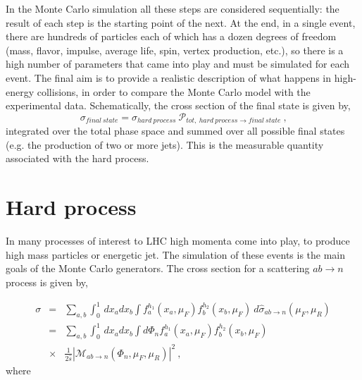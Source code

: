 In the  Monte Carlo simulation  all these steps are considered sequentially: the result of each step is the starting point of the next.
At the end, in a single event, there are hundreds of particles each of which has a dozen degrees of freedom (mass, flavor, impulse, average life, spin, vertex production, etc.), so there is a  high number of parameters that came into play and must be simulated for each event.
The final aim is to provide a realistic description of what happens in high-energy collisions, in order to compare the Monte Carlo model with the experimental data.
Schematically, the cross section of the final state is given by,
\begin{equation}
 \sigma_{final \: state}=\sigma_{hard \: process} \: \mathcal{P}_{tot, \:hard \: process \rightarrow final \:state} \: \mbox{,}\end{equation}
integrated over the total phase space and summed over all possible final states (e.g. the production of two or more jets). This is the measurable quantity associated with the hard process. \\




\section{Hard process}

In many processes of interest to LHC high momenta come into play, to produce high mass particles or  energetic jet. The simulation of these events is the main goals of the Monte Carlo generators.
The cross section for a scattering $ ab \rightarrow n $ process is given \cite{Buckley:2011ms} by,

\begin{eqnarray}
 \sigma & = & \sum_{a,b}  \int_{0}^{1} \, dx_{a} dx_b \int f_{a}^{h_1} (x_a , \mu_F) f_{b}^{h_2} (x_b , \mu_F) \: d \hat{\sigma}_{ab \rightarrow n}(\mu_F , \mu_R)  \nonumber \\
& = & \sum_{a,b}  \int_{0}^{1} \, dx_{a} dx_b \int d \Phi_n  f_{a}^{h_1} (x_a , \mu_F) f_{b}^{h_2} (x_b , \mu_F) \nonumber \\
 & \times& \frac{1}{2\hat{s}} 
 | \mathcal{M}_{ab \rightarrow n} 
(\Phi_n , \mu_F , \mu_R)|^2  \: \mbox{,} \end{eqnarray}
where




